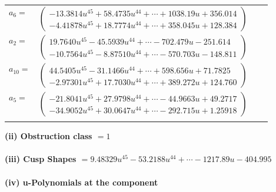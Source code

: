 \documentclass[1p]{elsarticle_modified}
\theoremstyle{definition}
\begin{document}
\begin{tabular}{m{7pt} m{180pt} m{7pt} m{180pt} }
\flushright $a_{6}=$&$\begin{pmatrix}-13.3814 u^{45}+58.4735 u^{44}+\cdots+1038.19 u+356.014\\-4.41878 u^{45}+18.7774 u^{44}+\cdots+358.045 u+128.384\end{pmatrix}$ \\
\flushright $a_{2}=$&$\begin{pmatrix}19.7640 u^{45}-45.5939 u^{44}+\cdots-702.479 u-251.614\\-10.7564 u^{45}-8.87510 u^{44}+\cdots-570.703 u-148.811\end{pmatrix}$ \\
\flushright $a_{10}=$&$\begin{pmatrix}44.5405 u^{45}-31.1466 u^{44}+\cdots+598.656 u+71.7825\\-2.97301 u^{45}+17.7030 u^{44}+\cdots+389.272 u+124.760\end{pmatrix}$ \\
\flushright $a_{5}=$&$\begin{pmatrix}-21.8041 u^{45}+27.9798 u^{44}+\cdots-44.9663 u+49.2717\\-34.9052 u^{45}+30.0647 u^{44}+\cdots-292.715 u+1.25918\end{pmatrix}$\\&\end{tabular}
\flushleft \textbf{(ii) Obstruction class $= 1$}\\~\\
\flushleft \textbf{(iii) Cusp Shapes $= 9.48329 u^{45}-53.2188 u^{44}+\cdots-1217.89 u-404.995$}\\~\\
\newpage\renewcommand{\arraystretch}{1}
\flushleft \textbf{(iv) u-Polynomials at the component}\newline \\
\end{document}
